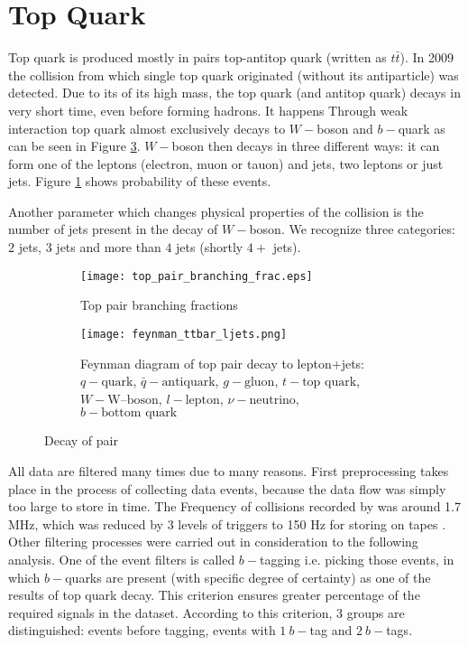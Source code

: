 \section{Top Quark}
Top quark is produced mostly in pairs top-antitop quark (written as $t\bar{t}$). In 2009 the collision from which single top quark originated  (without its antiparticle) was detected. Due to its of its high mass, the top quark (and antitop quark) decays in very short time, even before forming hadrons. It happens Through weak interaction top quark almost exclusively decays to $W-$boson and $b-$quark as can be seen in Figure \ref{fig:feynman-ljets}. $W-$boson then decays in three different ways: it can form one of the leptons (electron, muon or tauon) and jets, two leptons or just jets. Figure \ref{fig:ttbarBranchingFrac} shows probability of these events. 

Another parameter which changes physical properties of the collision is the number of jets present in the decay of $W-$boson. We recognize three categories: $2$ jets, $3$ jets and more than $4$ jets (shortly $4+$ jets).

\begin{figure}[h]
  \centering
  \begin{subfigure}{.55	\textwidth}\centering
    \texttt{[image: top\_pair\_branching\_frac.eps]}
    \caption{Top pair branching fractions}
    \label{fig:ttbarBranchingFrac}
  \end{subfigure}\hspace{3mm}
  \begin{subfigure}{.4\textwidth}\centering
    \texttt{[image: feynman\_ttbar\_ljets.png]}
    \caption{Feynman diagram of top pair decay to lepton+jets: 
    $q - \text{quark}$,
    $\bar{q} - \text{antiquark}$,
	$g - \text{gluon}$,
	$t - \text{top quark}$,
    $W - \text{W--boson}$,
    $l - \text{lepton}$,
    $\nu - \text{neutrino}$,
    $b - \text{bottom quark}$ \cite{Heinson}}
   	\label{fig:feynman-ljets}
  \end{subfigure}
  \caption{Decay of \ttbar pair}
\end{figure} 

All data are filtered many times due to many reasons. First preprocessing takes  place in the process of collecting data events, because the data flow was simply too large to store in time. The Frequency of collisions recorded by \dzero was around 1.7 MHz, which was reduced by 3 levels of triggers to 150 Hz for storing on tapes \cite{Yuntse}. Other filtering processes were carried out in consideration to the following analysis. One of the event filters is called $b-$tagging i.e. picking those events, in which $b-$quarks are present (with specific degree of certainty) as one of the results of top quark decay. This criterion ensures greater percentage of the required signals in the dataset. According to this criterion, 3 groups are distinguished: events before tagging, events with $1\: b-$tag and $2\: b-$tags.


